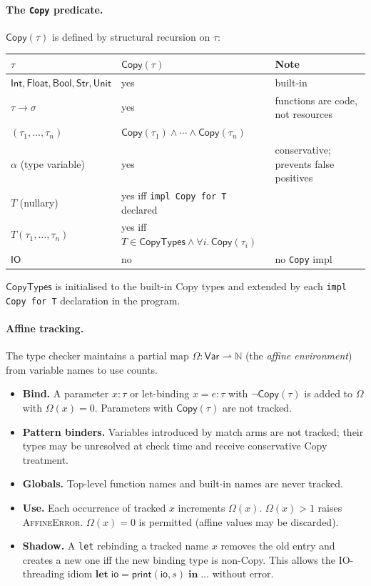 \documentclass[10pt,a4paper]{article}
\newcommand{\TInt}{\mathsf{Int}}
\newcommand{\TFlt}{\mathsf{Float}}
\newcommand{\TBool}{\mathsf{Bool}}
\newcommand{\TStr}{\mathsf{Str}}
\newcommand{\TUnit}{\mathsf{Unit}}
\newcommand{\TIO}{\mathsf{IO}}
\newcommand{\TCopy}{\mathsf{Copy}}
\newcommand{\klet}{\mathbf{let}}
\newcommand{\kin}{\mathbf{in}}
\theoremstyle{plain}
\theoremstyle{definition}
\theoremstyle{remark}
\begin{document}
\paragraph{The \texttt{Copy} predicate.}
$\TCopy(\tau)$ is defined by structural recursion on $\tau$:
\begin{center}
\renewcommand{\arraystretch}{1.25}
\begin{tabular}{@{}lll@{}}
\toprule
$\tau$ & $\TCopy(\tau)$ & Note \\
\midrule
$\TInt,\TFlt,\TBool,\TStr,\TUnit$ & yes & built-in \\
$\tau\to\sigma$                    & yes & functions are code, not resources \\
$(\tau_1,\ldots,\tau_n)$           & $\TCopy(\tau_1)\wedge\cdots\wedge\TCopy(\tau_n)$ & \\
$\alpha$ (type variable)           & yes & conservative; prevents false positives \\
$T$ (nullary)                      & yes iff \texttt{impl Copy for T} declared & \\
$T(\tau_1,\ldots,\tau_n)$          & yes iff $T\in\mathsf{CopyTypes}\wedge\forall i.\,\TCopy(\tau_i)$ & \\
$\TIO$                             & no & no \texttt{Copy} impl \\
\bottomrule
\end{tabular}
\end{center}
\noindent $\mathsf{CopyTypes}$ is initialised to the built-in Copy types and
extended by each \texttt{impl Copy for T} declaration in the program.

\paragraph{Affine tracking.}
The type checker maintains a partial map
$\Omega : \mathsf{Var}\rightharpoonup\mathbb{N}$ (the \emph{affine
environment}) from variable names to use counts.

\begin{itemize}\itemsep3pt
\item \textbf{Bind.}  A parameter $x:\tau$ or let-binding $x=e:\tau$ with
  $\lnot\TCopy(\tau)$ is added to $\Omega$ with $\Omega(x)=0$.  Parameters
  with $\TCopy(\tau)$ are not tracked.
\item \textbf{Pattern binders.}  Variables introduced by match arms are not
  tracked; their types may be unresolved at check time and receive
  conservative Copy treatment.
\item \textbf{Globals.}  Top-level function names and built-in names are
  never tracked.
\item \textbf{Use.}  Each occurrence of tracked $x$ increments $\Omega(x)$.
  $\Omega(x)>1$ raises \textsc{AffineError}.  $\Omega(x)=0$ is permitted
  (affine values may be discarded).
\item \textbf{Shadow.}  A \texttt{let} rebinding a tracked name $x$ removes
  the old entry and creates a new one iff the new binding type is non-Copy.
  This allows the IO-threading idiom
  $\klet\;\mathsf{io}=\mathsf{print}(\mathsf{io},s)\;\kin\;\ldots$ without
  error.
\end{itemize}
\end{document}
